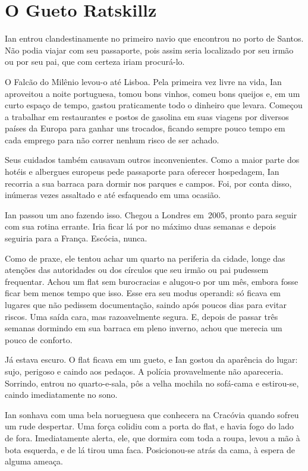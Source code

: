 \chapter{O Gueto Ratskillz}

Ian entrou clandestinamente no primeiro navio que encontrou no porto de
Santos. Não podia viajar com seu passaporte, pois assim seria localizado
por seu irmão ou por seu pai, que com certeza iriam procurá-lo.

O Falcão do Milênio levou-o até Lisboa. Pela primeira vez livre na vida,
Ian aproveitou a noite portuguesa, tomou bons vinhos, comeu bons queijos
e, em um curto espaço de tempo, gastou praticamente todo o dinheiro que
levara. Começou a trabalhar em restaurantes e postos de gasolina em suas
viagens por diversos países da Europa para ganhar uns trocados, ficando
sempre pouco tempo em cada emprego para não correr nenhum risco de ser
achado.

Seus cuidados também causavam outros inconvenientes. Como a maior parte
dos hotéis e albergues europeus pede passaporte para oferecer
hospedagem, Ian recorria a sua barraca para dormir nos parques e campos.
Foi, por conta disso, inúmeras vezes assaltado e até esfaqueado em uma
ocasião.

Ian passou um ano fazendo isso. Chegou a Londres em~2005, pronto para
seguir com sua rotina errante. Iria ficar lá por no máximo duas semanas
e depois seguiria para a França. Escócia, nunca.

Como de praxe, ele tentou achar um quarto na periferia da cidade, longe
das atenções das autoridades ou dos círculos que seu irmão ou pai
pudessem frequentar. Achou um flat sem burocracias e alugou-o por um
mês, embora fosse ficar bem menos tempo que isso. Esse era seu modus
operandi: só ficava em lugares que não pedissem documentação, saindo
após poucos dias para evitar riscos. Uma saída cara, mas razoavelmente
segura. E, depois de passar três semanas dormindo em sua barraca em
pleno inverno, achou que merecia um pouco de conforto.

Já estava escuro. O flat ficava em um gueto, e Ian gostou da aparência
do lugar: sujo, perigoso e caindo aos pedaços. A polícia provavelmente 
não apareceria. Sorrindo, entrou no quarto-e-sala, pôs a velha mochila 
no sofá-cama e estirou-se, caindo imediatamente no sono.

Ian sonhava com uma bela norueguesa que conhecera na Cracóvia quando
sofreu um rude despertar. Uma força colidiu com a porta do flat, e havia
fogo do lado de fora. Imediatamente alerta, ele, que dormira com toda a
roupa, levou a mão à bota esquerda, e de lá tirou uma faca.
Posicionou-se atrás da cama, à espera de alguma ameaça.

